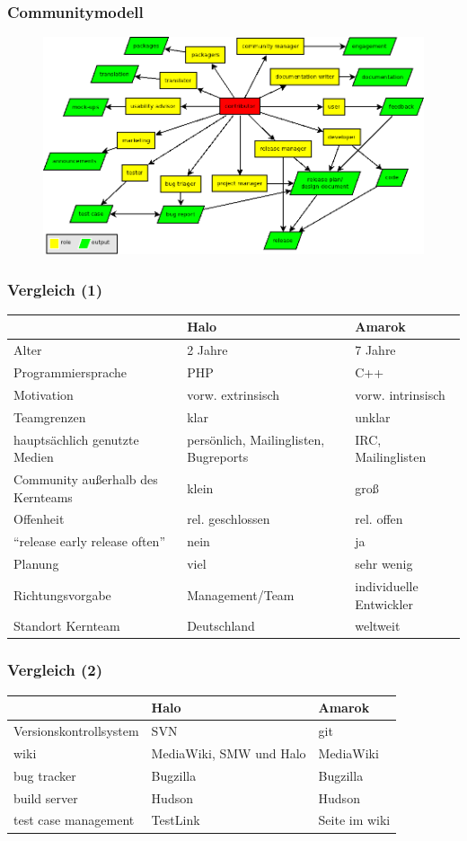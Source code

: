 \documentclass{beamer}
\begin{document}
\begin{frame}
\frametitle{Communitymodell}
\begin{figure}[h!]
 \centering
 \includegraphics[scale=0.35,keepaspectratio=true]{./ontology.png}
\end{figure}
\end{frame}

\begin{frame}
\frametitle{Vergleich (1)}
\begin{tabularx}{\textwidth}{|X|X|X|}
\hline
 & Halo & Amarok \\
\hline \hline
Alter & 2 Jahre & 7 Jahre \\
\hline
Programmiersprache & PHP & C++ \\
\hline
Motivation & vorw. extrinsisch & vorw. intrinsisch \\
\hline
Teamgrenzen & klar & unklar\\
\hline
haupts\"achlich genutzte Medien & pers\"onlich, Mailinglisten, Bugreports & IRC, Mailinglisten \\
\hline
Community au\ss erhalb des Kernteams & klein & gro\ss \\
\hline
Offenheit & rel. geschlossen & rel. offen \\
\hline
``release early release often'' & nein & ja \\
\hline
Planung & viel & sehr wenig \\
\hline
Richtungsvorgabe & Management/Team & individuelle Entwickler \\
\hline
Standort Kernteam & Deutschland & weltweit \\
\hline
\end{tabularx}
\end{frame}

\begin{frame}
\frametitle{Vergleich (2)}
\begin{tabularx}{\textwidth}{|X|X|X|}
\hline
 & Halo & Amarok\\
\hline \hline
Versionskontrollsystem & SVN & git\\
\hline
wiki & MediaWiki, SMW und Halo & MediaWiki\\
\hline
bug tracker & Bugzilla & Bugzilla\\
\hline
build server & Hudson & Hudson\\
\hline
test case management & TestLink & Seite im wiki\\
\hline
\end{tabularx}
\end{frame}
\end{document}
